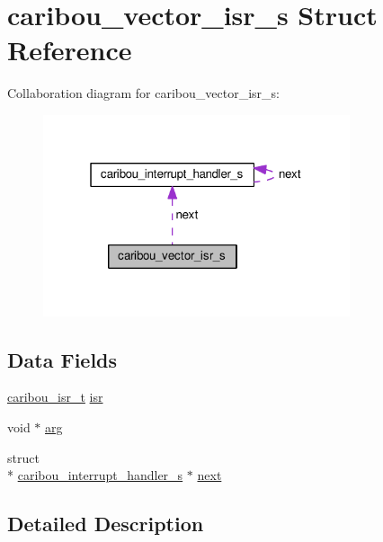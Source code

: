 \hypertarget{structcaribou__vector__isr__s}{\section{caribou\-\_\-vector\-\_\-isr\-\_\-s Struct Reference}
\label{structcaribou__vector__isr__s}
}


Collaboration diagram for caribou\-\_\-vector\-\_\-isr\-\_\-s\-:
\nopagebreak
\begin{figure}[H]
\begin{center}
\leavevmode
\includegraphics[width=256pt]{structcaribou__vector__isr__s__coll__graph}
\end{center}
\end{figure}
\subsection*{Data Fields}
\begin{DoxyCompactItemize}
\item 
\hyperlink{interrupt_8h_af609f1916308a4ac8148b51cad03f620}{caribou\-\_\-isr\-\_\-t} \hyperlink{structcaribou__vector__isr__s_a31515e3e911a86a7a7a9813741963476}{isr}
\item 
void $\ast$ \hyperlink{structcaribou__vector__isr__s_a69c6e5eb71a00da6d588fe67ca848cf0}{arg}
\item 
struct \\*
\hyperlink{structcaribou__interrupt__handler__s}{caribou\-\_\-interrupt\-\_\-handler\-\_\-s} $\ast$ \hyperlink{structcaribou__vector__isr__s_a801c57c3cd570449fb04863be1129854}{next}
\end{DoxyCompactItemize}


\subsection{Detailed Description}



